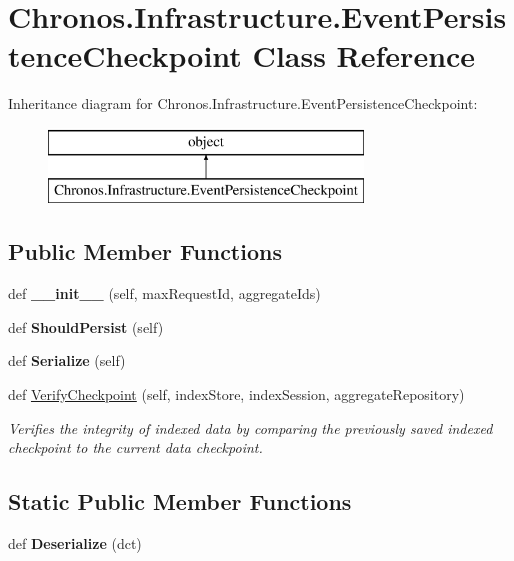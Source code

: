 \hypertarget{classChronos_1_1Infrastructure_1_1EventPersistenceCheckpoint}{}\section{Chronos.\+Infrastructure.\+Event\+Persistence\+Checkpoint Class Reference}
\label{classChronos_1_1Infrastructure_1_1EventPersistenceCheckpoint}
Inheritance diagram for Chronos.\+Infrastructure.\+Event\+Persistence\+Checkpoint\+:\begin{figure}[H]
\begin{center}
\leavevmode
\includegraphics[height=2.000000cm]{classChronos_1_1Infrastructure_1_1EventPersistenceCheckpoint}
\end{center}
\end{figure}
\subsection*{Public Member Functions}
\begin{DoxyCompactItemize}
\item 
def {\bfseries \+\_\+\+\_\+init\+\_\+\+\_\+} (self, max\+Request\+Id, aggregate\+Ids)
\item 
def {\bfseries Should\+Persist} (self)
\item 
def {\bfseries Serialize} (self)
\item 
def \hyperlink{group__Chronos_ga53d19167c4fc3cba7bb55c84ccdefbcd}{Verify\+Checkpoint} (self, index\+Store, index\+Session, aggregate\+Repository)
\begin{DoxyCompactList}\small\item\em Verifies the integrity of indexed data by comparing the previously saved indexed checkpoint to the current data checkpoint. \end{DoxyCompactList}\end{DoxyCompactItemize}
\subsection*{Static Public Member Functions}
\begin{DoxyCompactItemize}
\item 
def {\bfseries Deserialize} (dct)
\end{DoxyCompactItemize}
